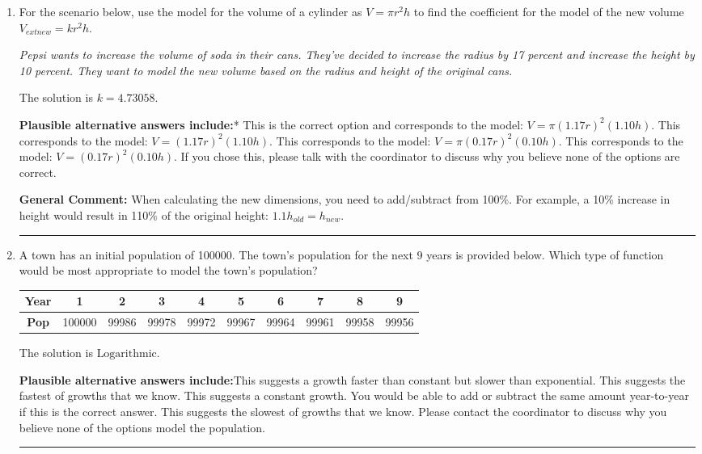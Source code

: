 \documentclass{extbook}[14pt]
\newcommand{\litem}[1]{\item #1

\rule{\textwidth}{0.4pt}}
\begin{document}
\begin{enumerate}\litem{
For the scenario below, use the model for the volume of a cylinder as $V = \pi r^2 h$ to find the coefficient for the model of the new volume $V_{	ext{new}} = k r^2 h$.

\begin{center}
    \textit{ Pepsi wants to increase the volume of soda in their cans. They've decided to increase the radius by 17 percent and increase the height by 10 percent. They want to model the new volume based on the radius and height of the original cans. }
\end{center}
The solution is \( k = 4.73058 \).\begin{enumerate}[label=\Alph*.]
\textbf{Plausible alternative answers include:}* This is the correct option and corresponds to the model: $V = \pi (1.17 r)^2 (1.10 h)$.
This corresponds to the model: $V = (1.17 r)^2 (1.10 h)$.
This corresponds to the model: $V = \pi (0.17 r)^2 (0.10 h)$.
This corresponds to the model: $V = (0.17 r)^2 (0.10 h)$.
If you chose this, please talk with the coordinator to discuss why you believe none of the options are correct.
\end{enumerate}

\textbf{General Comment:} When calculating the new dimensions, you need to add/subtract from 100\%. For example, a 10\% increase in height would result in 110\% of the original height: $1.1h_{old} = h_{new}$.
}
\litem{
A town has an initial population of 100000. The town's population for the next 9 years is provided below. Which type of function would be most appropriate to model the town's population?


\begin{tabular}{c|c|c|c|c|c|c|c|c|c}
\textbf{Year} &1 &2 &3 &4 &5 &6 &7 &8 &9\tabularnewline \hline
\textbf{Pop} &100000 &99986 &99978 &99972 &99967 &99964 &99961 &99958 &99956\end{tabular}The solution is \( \text{Logarithmic} \).\begin{enumerate}[label=\Alph*.]
\textbf{Plausible alternative answers include:}This suggests a growth faster than constant but slower than exponential.
This suggests the fastest of growths that we know.
This suggests a constant growth. You would be able to add or subtract the same amount year-to-year if this is the correct answer.
This suggests the slowest of growths that we know.
Please contact the coordinator to discuss why you believe none of the options model the population.
\end{enumerate}

}
\end{enumerate}
\end{document}
